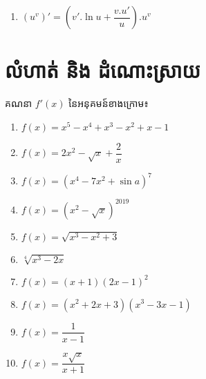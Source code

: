 \documentclass[a4paper,12pt]{article}
\begin{document}
\begin{multicols}{2}
\begin{enumerate}
		\item $(u^v)'=\left(v' .\ln u +\dfrac{v.u'}{u} \right).u^v$
	\end{enumerate}
\end{multicols}

\newpage
\section{លំហាត់ និង ដំណោះស្រាយ}
\begin{exercise}
	គណនា $f'(x)$ នៃអនុគមន៍ខាងក្រោម៖
	\begin{multicols}{2}
		\begin{enumerate}
			\item $f(x)=x^5-x^4+x^3-x^2+x-1$
			\item $f(x)=2x^2-\sqrt{x}+\dfrac{2}{x}$
			\item $f(x)=(x^4-7x^2+\sin a)^7$
			\item $f(x)=(x^2-\sqrt{x})^{2019}$
			\item $f(x)=\sqrt{x^3-x^2+3}$
			\item $\sqrt[4]{x^3-2x}$
			\item $f(x)=(x+1)(2x-1)^2$
			\item $f(x)=(x^2+2x+3)(x^3-3x-1)$
			\item $f(x)=\dfrac{1}{x-1}$
			\item $f(x)=\dfrac{x\sqrt{x}}{x+1}$

		\end{enumerate}
	\end{multicols}
\end{exercise}
\end{document}
